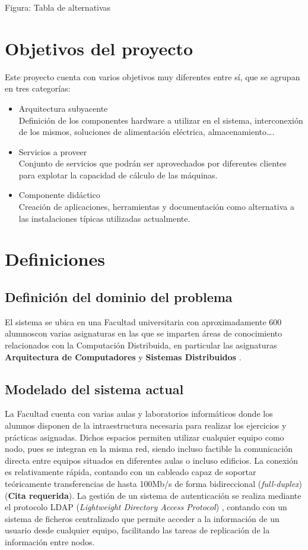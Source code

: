 Figura: Tabla de alternativas

\section{Objetivos del proyecto}

Este proyecto cuenta con varios objetivos muy diferentes entre sí, que se agrupan en tres categorías:
\begin{itemize}
  \item Arquitectura subyacente\\
  Definición de los componentes hardware a utilizar en el sistema, interconexión de los mismos, soluciones de alimentación eléctrica, almacenamiento\dots.
  \item Servicios a proveer\\
  Conjunto de servicios que podrán ser aprovechados por diferentes clientes para explotar la capacidad de cálculo de las máquinas.
  \item Componente didáctico\\
  Creación de aplicaciones, herramientas y documentación como alternativa a las instalaciones típicas utilizadas actualmente.
\end{itemize}

\section{Definiciones}

\subsection{Definición del dominio del problema}

El sistema se ubica en una Facultad universitaria con aproximadamente 600 alumnos\citationneeded con varias asignaturas en las que se imparten áreas de conocimiento relacionados con la Computación Distribuida, en particular las asignaturas \textbf{Arquitectura de Computadores} y \textbf{Sistemas Distribuidos} \cite{DIA15GuiaAcademica}.

\subsection{Modelado del sistema actual}

La Facultad cuenta con varias aulas y laboratorios informáticos donde los alumnos disponen de la intraestructura necesaria para realizar los ejercicios y prácticas asignadas. Dichos espacios permiten utilizar cualquier equipo como nodo, pues se integran en la misma red, siendo incluso factible la comunicación directa entre equipos situados en diferentes aulas o incluso edificios. La conexión es relativamente rápida, contando con un cableado capaz de soportar teóricamente transferencias de hasta 100Mb/s de forma bidireccional (\textit{full-duplex}) (\textbf{Cita requerida}). La gestión de un sistema de autenticación se realiza mediante el protocolo LDAP (\textit{Lightweight Directory Access Protocol}) \cite{RFC4516-comment}, contando con un sistema de ficheros centralizado que permite acceder a la información de un usuario desde cualquier equipo, facilitando las tareas de replicación de la información entre nodos.

